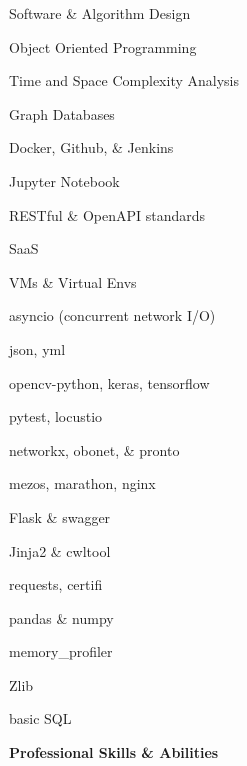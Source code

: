 \documentclass[letterpaper,final]{memoir}
\newcommand{\Sep}{\vspace{1.0em}}
\newcommand{\SmallSep}{\vspace{0.4em}}
\newcommand{\CVItem}[1]
	{\textbf{\color{Blue} #1}}
\begin{document}
\begin{multicols}{2}

    \begin{compactitem}[\color{Blue}$\circ$]
        
        \item Software \& Algorithm Design
        \SmallSep
        \item Object Oriented Programming
        \SmallSep
        \item Time and Space Complexity Analysis
        \SmallSep
        \item Graph Databases
		\SmallSep
        \item Docker, Github, \& Jenkins
        \SmallSep
        \item Jupyter Notebook
        \SmallSep
        \item RESTful \& OpenAPI standards
        \SmallSep
        \item SaaS
		\SmallSep
        \item VMs \& Virtual Envs
        \SmallSep
        \item asyncio (concurrent network I/O)
        \SmallSep
        \item json, yml
        \SmallSep
        \item opencv-python, keras, tensorflow
        \SmallSep
        \item pytest, locustio
        \SmallSep
        \item networkx, obonet, \& pronto
        \SmallSep 
        \item mezos, marathon, nginx
        \SmallSep
        \item Flask \& swagger
        \SmallSep
        \item Jinja2 \& cwltool
        \SmallSep
        \item requests, certifi
        \SmallSep
        \item pandas \& numpy
        \SmallSep
        \item memory\_profiler
        \SmallSep
        \item Zlib
        \SmallSep
        \item basic SQL
      
    \end{compactitem}

\end{multicols}
\Sep

\CVItem{Professional Skills \& Abilities}
\Sep
\end{document}
